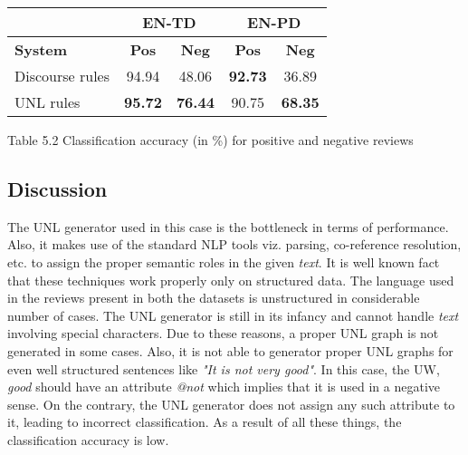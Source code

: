 \begin{center}
  \begin{tabular}[h]{l|c|c|c|c|}
   \cline{2-5}
    & \multicolumn{2}{|c|}{\textbf{EN-TD}} & \multicolumn{2}{|c|}{\textbf{EN-PD}} \\ \hline
    \textbf{System} & \textbf{Pos} & \textbf{Neg} & \textbf{Pos} & \textbf{Neg} \\ \hline \hline
    Discourse rules & 94.94 & 48.06 & \textbf{92.73} & 36.89 \\ \hline
    UNL rules & \textbf{95.72} & \textbf{76.44} & 90.75 & \textbf{68.35} \\ \hline
   \hline
  \end{tabular}
\end{center} 
\begin{center}
 Table 5.2 Classification accuracy (in \%) for positive and negative reviews
\end{center}

\subsection{Discussion}

The UNL generator used in this case is the bottleneck in terms of performance. Also, it makes use of the standard NLP tools viz. parsing, co-reference resolution, etc. 
to assign the proper semantic roles in the given \textit{text}. It is well known fact that these techniques work properly only on structured data. The language used in 
the reviews present in both the datasets is unstructured in considerable number of cases. The UNL generator is still in its infancy and cannot handle \textit{text} 
involving special characters. Due to these reasons, a proper UNL graph is not generated in some cases. Also, it is not able to generator proper UNL graphs for even well 
structured sentences like \textit{"It is not very good"}. In this case, the UW,  \textit{good} should have an attribute \textit{@not} which implies that it is used in 
a negative sense. On the contrary, the UNL generator does not assign any such attribute to it, leading to incorrect classification. As a result of all these things, the 
classification accuracy is low.

